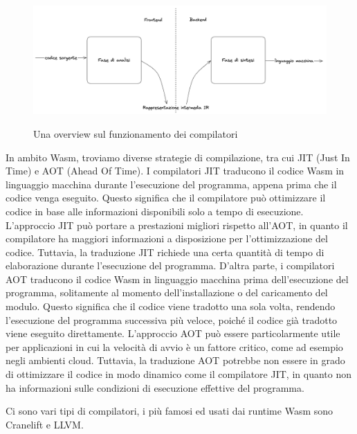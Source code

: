 \begin{figure}[H]
    \centering
    \captionsetup{justification=centering}
    \includegraphics[width=15cm]{./chapters/2.wasi-in-depth/images/7.how_compilers_work.png}
    \label{how_compilers_work_simplified}
    \caption{Una overview sul funzionamento dei compilatori}
\end{figure}

In ambito Wasm, troviamo diverse strategie di compilazione, tra cui JIT (Just In Time) e AOT (Ahead Of Time). I
compilatori JIT traducono il codice Wasm in linguaggio macchina durante l'esecuzione del programma, appena prima che il
codice venga eseguito. Questo significa che il compilatore può ottimizzare il codice in base alle informazioni
disponibili solo a tempo di esecuzione. L'approccio JIT può portare a prestazioni migliori rispetto all'AOT, in quanto
il compilatore ha maggiori informazioni a disposizione per l'ottimizzazione del codice. Tuttavia, la traduzione JIT
richiede una certa quantità di tempo di elaborazione durante l'esecuzione del programma. D'altra parte, i compilatori
AOT traducono il codice Wasm in linguaggio macchina prima dell'esecuzione del programma, solitamente al momento
dell'installazione o del caricamento del modulo. Questo significa che il codice viene tradotto una sola volta, rendendo
l'esecuzione del programma successiva più veloce, poiché il codice già tradotto viene eseguito direttamente. L'approccio
AOT può essere particolarmente utile per applicazioni in cui la velocità di avvio è un fattore critico, come ad esempio
negli ambienti cloud. Tuttavia, la traduzione AOT potrebbe non essere in grado di ottimizzare il codice in modo dinamico
come il compilatore JIT, in quanto non ha informazioni sulle condizioni di esecuzione effettive del programma.

Ci sono vari tipi di compilatori, i più famosi ed usati dai runtime Wasm sono Cranelift e LLVM.
